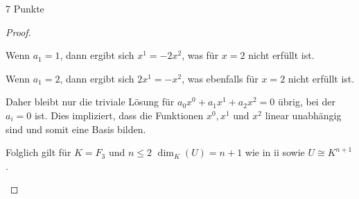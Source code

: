 \documentclass{problemset}
\begin{document}
\begin{problem}{7 Punkte}
\begin{proof}
\begin{enumerate}
		      Wenn $a_1 = 1$, dann ergibt sich $x^1 = -2x^2$, was für $x = 2$ nicht erfüllt ist.

		      Wenn $a_1 = 2$, dann ergibt sich $2x^1 = -x^2$, was ebenfalls für $x = 2$ nicht erfüllt ist.

		      Daher bleibt nur die triviale Lösung für $a_0x^0 + a_1x^1 + a_2x^2 = 0$ übrig, bei der $a_i = 0$ ist. Dies impliziert, dass die
		      Funktionen $x^0, x^1$ und $x^2$ linear unabhängig sind und somit eine Basis bilden.

		      Folglich gilt für $K = F_3$ und $n \leq 2$ $\dim_K(U) = n + 1$ wie in ii sowie $U \cong K^{n+1}$.
	\end{enumerate}
\end{proof}

\end{problem}
\end{document}
